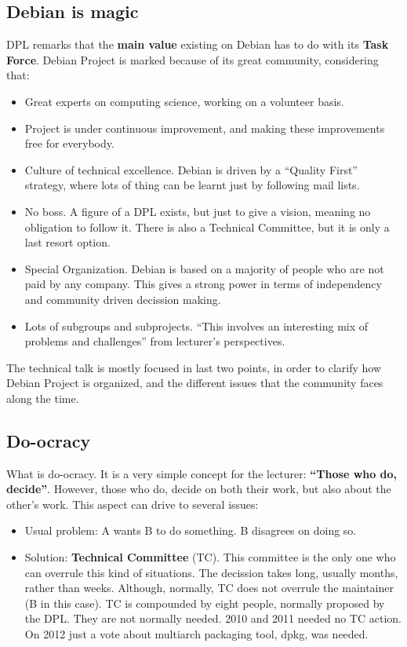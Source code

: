 \documentclass[11pt]{article}
\begin{document}
\subsection{Debian is magic}
DPL remarks that the \textbf{main value} existing on Debian has to do with its \textbf{Task Force}. Debian Project is marked because of its great community, considering that:
\begin{itemize}\itemsep0pt
\item{Great experts on computing science, working on a volunteer basis}.
\item{Project is under continuous improvement, and making these improvements free for everybody}.
\item{Culture of technical excellence.} Debian is driven by a ``Quality First'' strategy, where lots of thing can be learnt just by following mail lists.
\item{No boss.} A figure of a DPL exists, but just to give a vision, meaning no obligation to follow it. There is also a Technical Committee, but it is only a last resort option.
\item{Special Organization.} Debian is based on a majority of people who are not paid by any company. This gives a strong power in terms of independency and community driven decission making.
\item{Lots of subgroups and subprojects.} ``This involves an interesting mix of problems and challenges'' from lecturer's perspectives.
\end{itemize}
The technical talk is mostly focused in last two points, in order to clarify how Debian Project is organized, and the different issues that the community faces along the time.

\subsection{Do-ocracy}
What is do-ocracy. It is a very simple concept for the lecturer: \textbf{``Those who do, decide''}. However, those who do, decide on both their work, but also about the other's work. This aspect can drive to several issues:
\begin{itemize}\itemsep0pt
\item{Usual problem}: A wants B to do something. B disagrees on doing so.
\item{Solution}: \textbf{Technical Committee} (TC). This committee is the only one who can overrule this kind of situations. The decission takes long, usually months, rather than weeks. Although, normally, TC does not overrule the maintainer (B in this case). TC is compounded by eight people, normally proposed by the DPL. They are not normally needed. 2010 and 2011 needed no TC action. On 2012 just a vote about multiarch packaging tool, dpkg, was needed.
\end{itemize}
\end{document}

